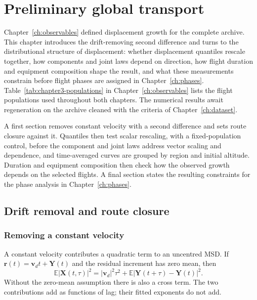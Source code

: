 \chapter{Preliminary global transport}
\label{ch:global}

Chapter~\ref{ch:observables} defined displacement growth for the complete archive. This
chapter introduces the drift-removing second difference and turns to the distributional
structure of displacement: whether displacement quantiles rescale together, how
components and joint laws depend on direction, how flight duration and equipment
composition shape the result, and what these measurements constrain before flight phases
are assigned in Chapter~\ref{ch:phases}.
Table~\ref{tab:chapter3-populations} in Chapter~\ref{ch:observables} lists the flight
populations used throughout both chapters.
\ifnum{}
The numerical results await regeneration on the archive cleaned with the criteria
of Chapter~\ref{ch:dataset}.
\fi

A first section removes constant velocity with a second difference and sets route
closure against it. Quantiles then test scalar rescaling, with a fixed-population
control, before the component and joint laws address vector scaling and dependence, and
time-averaged curves are grouped by region and initial altitude. Duration and equipment
composition then check how the observed growth depends on the selected flights. A final section states
the resulting constraints for the phase analysis in Chapter~\ref{ch:phases}.

\FloatBarrier
\section{Drift removal and route closure}
\label{sec:drift-closure}

\subsection{Removing a constant velocity}
\label{sec:variations}

A constant velocity contributes a quadratic term to an uncentred MSD. If
$\mathbf r(t)=\mathbf v_d t+\mathbf Y(t)$ and the residual increment has zero mean, then
\begin{equation}
  \mathbb E|\mathbf X(t,\tau)|^2
   =|\mathbf v_d|^2\tau^2+
      \mathbb E|\mathbf Y(t+\tau)-\mathbf Y(t)|^2.
  \label{eq:drift-msd}
\end{equation}
Without the zero-mean assumption there is also a cross term. The two contributions add
as functions of lag; their fitted exponents do not add.

